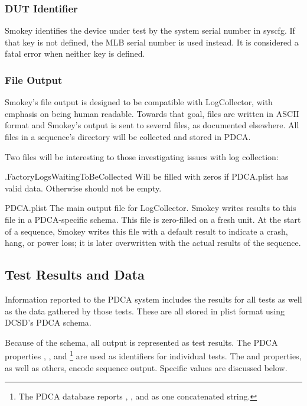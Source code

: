 \subsubsection{DUT Identifier}

Smokey identifies the device under test by the system serial number
 in syscfg.  If that key is not defined, the MLB serial number
 is used instead.  It is considered a fatal error when neither key
is defined.

\subsubsection{File Output}

Smokey's file output is designed to be compatible with LogCollector, with
emphasis on being human readable.  Towards that goal, files are written in
ASCII format and Smokey's output is sent to several files, as documented
elsewhere.  All files in a sequence's directory will be collected and stored in
PDCA.

Two files will be interesting to those investigating issues with log
collection:

\begin{Definition}

\item[.FactoryLogsWaitingToBeCollected] Will be filled with zeros if
PDCA.plist has valid data.  Otherwise should not be empty.

\item[PDCA.plist] The main output file for LogCollector.  Smokey writes results
to this file in a PDCA-specific schema.  This file is zero-filled on a fresh
unit.  At the start of a sequence, Smokey writes this file with a default
result to indicate a crash, hang, or power loss; it is later overwritten with
the actual results of the sequence.

\end{Definition}

\subsection{Test Results and Data}
\label{subsec:TestResults}

Information reported to the PDCA system includes the results for all tests as
well as the data gathered by those tests.  These are all stored in plist format
using DCSD's PDCA schema.

Because of the schema, all output is represented as test results.  The PDCA
properties , , and
\footnote{The PDCA database reports ,
, and  as one concatenated string.} are
used as identifiers for individual tests.  The  and
 properties, as well as others, encode sequence output.
Specific values are discussed below.

